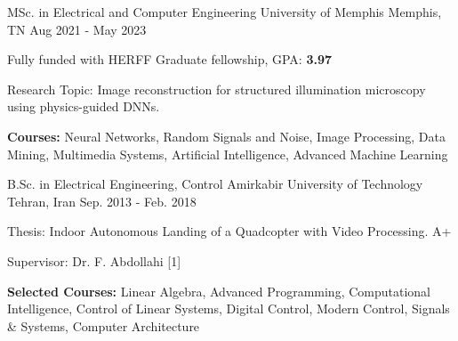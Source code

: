 

\begin{cventries}

  \cventry
    {MSc. in Electrical and Computer Engineering} %
    {University of Memphis} %
    {Memphis, TN} %
    {Aug 2021 - May 2023} %
    {
      \begin{cvitems} %
        \item {Fully funded with HERFF Graduate fellowship, GPA:\textbf{ 3.97}}
        \item {Research Topic: Image reconstruction for structured illumination microscopy using physics-guided DNNs.}
        \item {\textbf{Courses:} Neural Networks, Random Signals and Noise, Image Processing, Data Mining, Multimedia Systems, Artificial Intelligence, Advanced Machine Learning}
      \end{cvitems}
    }
    
  \cventry
    {B.Sc. in Electrical Engineering, Control} %
    {Amirkabir University of Technology} %
    {Tehran, Iran} %
    {Sep. 2013 - Feb. 2018} %
    {
      \begin{cvitems} %
        \item {Thesis: Indoor Autonomous Landing of a Quadcopter with Video Processing. A+} 
        \item {Supervisor: Dr. F. Abdollahi [1]} 
        \item {\textbf{Selected Courses:} Linear Algebra, Advanced Programming, Computational Intelligence, Control of Linear Systems, Digital Control, Modern Control, Signals \& Systems, Computer Architecture}
      \end{cvitems}
        }
    

\end{cventries}
